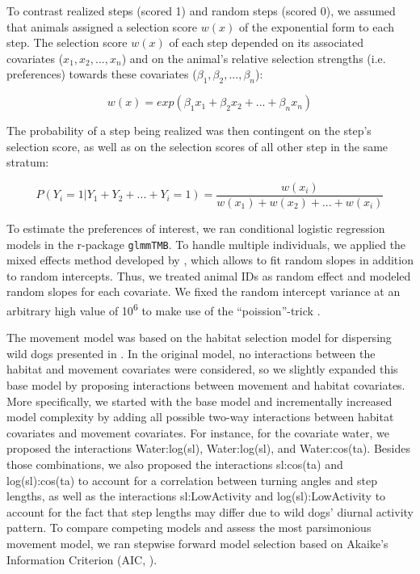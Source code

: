 \documentclass[abstract=on,10pt,a4paper,bibliography=totocnumbered]{article}
\begin{document}
To contrast realized steps (scored 1) and random steps (scored 0), we assumed
that animals assigned a selection score \(w(x)\) of the exponential form to each
step. The selection score \(w(x)\) of each step depended on its associated
covariates (\(x_1, x_2, ..., x_n\)) and on the animal's relative selection
strengths (i.e. preferences) towards these covariates (\(\beta_1, \beta_2, ...,
\beta_n\)):

\begin{equation}
\label{EQ1}
  w(x) = exp(\beta_1 x_1 + \beta_2 x_2 + ... + \beta_n x_n)
\end{equation}

The probability of a step being realized was then contingent on the step's
selection score, as well as on the selection scores of all other step in the
same stratum:

\begin{equation}
\label{EQ2}
  P(Y_{i} = 1 | Y_{1} + Y_{2} + ... + Y_{i} = 1) =
  \frac{w(x_{i})}{w(x_{1}) + w(x_{2}) + ... + w(x_{i})}
\end{equation}

To estimate the preferences of interest, we ran conditional logistic regression
models in the r-package {\tt glmmTMB}. To handle multiple individuals, we
applied the mixed effects method developed by \citep{Muff.2020}, which allows to
fit random slopes in addition to random intercepts. Thus, we treated animal IDs
as random effect and modeled random slopes for each covariate. We fixed the
random intercept variance at an arbitrary high value of 10\textsuperscript{6} to
make use of the  ``poission''-trick \citep{Muff.2020}.

The movement model was based on the habitat selection model for dispersing wild
dogs presented in \cite{Hofmann.2021}. In the original model, no interactions
between the habitat and movement covariates were considered, so we slightly
expanded this base model by proposing interactions between movement and habitat
covariates. More specifically, we started with the base model and incrementally
increased model complexity by adding all possible two-way interactions between
habitat covariates and movement covariates. For instance, for the covariate
\textsf{water}, we proposed the interactions \textsf{Water:log(sl)},
\textsf{Water:log(sl)}, and \textsf{Water:cos(ta)}. Besides those combinations,
we also proposed the interactions \textsf{sl:cos(ta)} and
\textsf{log(sl):cos(ta)} to account for a correlation between turning angles and
step lengths, as well as the interactions \textsf{sl:LowActivity} and
\textsf{log(sl):LowActivity} to account for the fact that step lengths may
differ due to wild dogs' diurnal activity pattern. To compare competing models
and assess the most parsimonious movement model, we ran stepwise forward model
selection based on Akaike's Information Criterion (AIC, \citealp{Burnham.2002}).
\end{document}

